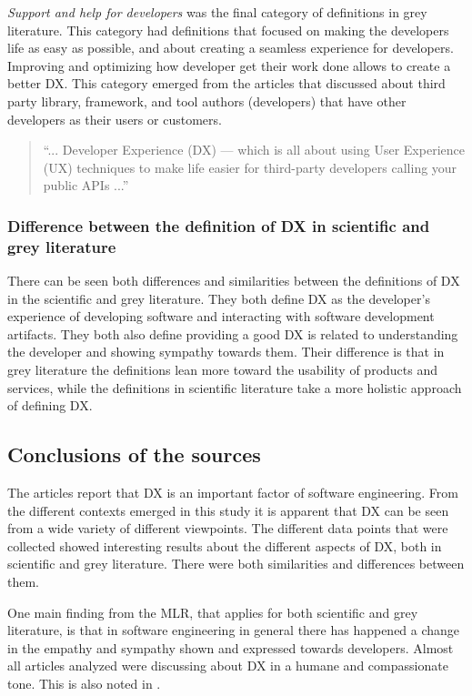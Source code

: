 \documentclass[english, 12pt, a4paper, sci, utf8, a-1b, online]{aaltothesis}
\begin{document}
\textit{Support and help for developers} was the final category of definitions in grey literature. This category had definitions that focused on making the developers life as easy as possible, and about creating a seamless experience for developers. Improving and optimizing how developer get their work done allows to create a better DX. This category emerged from the articles that discussed about third party library, framework, and tool authors (developers) that have other developers as their users or customers.

\begin{quote}
  ``... Developer Experience (DX) — which is all about using User Experience (UX) techniques to make life easier for third-party developers calling your public APIs ...'' \parencite{4-must-read-articles-on-developer-experience}
\end{quote}

\subsubsection{Difference between the definition of DX in scientific and grey literature}

There can be seen both differences and similarities between the definitions of DX in the scientific and grey literature. They both define DX as the developer's experience of developing software and interacting with software development artifacts. They both also define providing a good DX is related to understanding the developer and showing sympathy towards them. Their difference is that in grey literature the definitions lean more toward the usability of products and services, while the definitions in scientific literature take a more holistic approach of defining DX.

\subsection{Conclusions of the sources}

The articles report that DX is an important factor of software engineering. From the different contexts emerged in this study it is apparent that DX can be seen from a wide variety of different viewpoints. The different data points that were collected showed interesting results about the different aspects of DX, both in scientific and grey literature. There were both similarities and differences between them.

One main finding from the MLR, that applies for both scientific and grey literature, is that in software engineering in general there has happened a change in the empathy and sympathy shown and expressed towards developers. Almost all articles analyzed were discussing about DX in a humane and compassionate tone. This is also noted in \textcite{voice-of-the-developer}.
\end{document}
